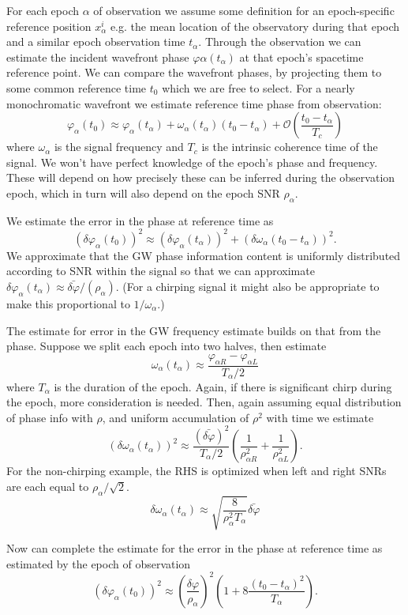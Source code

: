 \documentclass[aps,showpacs,12pt,onecolumn,prd,superscriptaddress,nofootinbib]{revtex4}
\begin{document}
For each epoch $\alpha$ of observation we assume some definition for an epoch-specific reference position $x^i_\alpha$ e.g.
the mean location of the observatory during that epoch and a similar epoch observation time $t_\alpha$.  Through the
observation we can estimate the incident wavefront phase $\varphi\alpha(t_\alpha)$
at that epoch's spacetime reference point.
We can compare the wavefront phases, by projecting them to some common reference time $t_0$ which we are free to select.
For a nearly monochromatic wavefront we estimate reference time phase from observation:
$$
\varphi_\alpha(t_0)\approx\varphi_\alpha(t_\alpha)+\omega_\alpha(t_\alpha)(t_0-t_\alpha) + \mathcal{O}\left(\frac{t_0-t_\alpha}{T_c}\right)
$$
where $\omega_\alpha$ is the signal frequency and $T_c$ is the intrinsic coherence time of the signal.
We won't have perfect knowledge of the epoch's phase and frequency. These will depend on how precisely these can be
inferred during the observation epoch, which in turn will also depend on the epoch SNR $\rho_\alpha$.

We estimate the error in the phase at reference time as
$$
\left(\delta\varphi_\alpha(t_0)\right)^2\approx\left(\delta\varphi_\alpha(t_\alpha)\right)^2+\left(\delta\omega_\alpha(t_0-t_\alpha)\right)^2. 
$$
We approximate that the GW phase information content is uniformly distributed according to SNR within the signal so that we can approximate $\delta\varphi_\alpha(t_\alpha)\approx\bar{\delta\varphi}/(\rho_\alpha)$.  (For a chirping signal it might also be appropriate to make this proportional to $1/\omega_\alpha$.)

The estimate for error in the GW frequency estimate builds on that from the phase.  Suppose we split each epoch into two halves, then estimate
$$
\omega_\alpha(t_\alpha)\approx\frac{\varphi_{\alpha R}-\varphi_{\alpha L}}{T_\alpha/2}
$$
where $T_\alpha$ is the duration of the epoch. Again, if there is significant chirp during the epoch, more consideration is needed.  Then, again assuming equal distribution of phase info with $\rho$, and uniform accumulation of $\rho^2$ with time we estimate
$$
\left(\delta\omega_\alpha(t_\alpha)\right)^2\approx\frac{\left(\bar{\delta\varphi}\right)^2}{T_\alpha/2}\left(\frac{1}{\rho^2_{\alpha R}}+\frac{1}{\rho^2_{\alpha L}}\right).
$$
For the non-chirping example, the RHS is optimized when left and right SNRs are each equal to $\rho_\alpha/\sqrt2$.
$$
\delta\omega_\alpha(t_\alpha)\approx\sqrt{\frac{8}{\rho^2_\alpha T_\alpha}}\bar{\delta\varphi}
$$

Now can complete the estimate for the error in the phase at reference time as estimated by the epoch of observation
$$
\left(\delta\varphi_\alpha(t_0)\right)^2\approx\left(\frac{\delta\varphi}{\rho_\alpha}\right)^2\left(1 + 8\frac{\left(t_0-t_\alpha\right)^2 }{T_\alpha}\right).
$$
\end{document}
